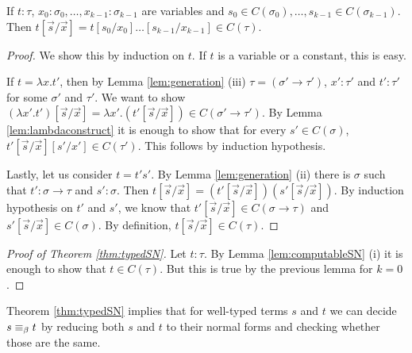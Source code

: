 \begin{boxlem}
    If $t : \tau$, $x_0 : \sigma_0, \dots, x_{k-1} : \sigma_{k-1}$ are variables and $s_0 \in C(\sigma_0), \dots, s_{k-1} \in C(\sigma_{k-1})$. 
    Then $t[\vec{s}/\vec{x}] = t [s_0 / x_0] \dots [s_{k-1} / x_{k - 1}] \in C(\tau)$.
\end{boxlem}
\begin{proof}
    We show this by induction on $t$.
    If $t$ is a variable or a constant, this is easy. 

    If $t = \lambda x. t'$, then by Lemma \ref{lem:generation} (iii) $\tau = (\sigma' \to \tau')$, $x' : \tau'$ and $t' : \tau'$ for some $\sigma'$ and $\tau'$.
    We want to show $(\lambda x'.t')[\vec{s}/\vec{x}] = \lambda x'. (t'[\vec{s}/\vec{x}]) \in C(\sigma' \to \tau')$.
    By Lemma \ref{lem:lambdaconstruct} it is enough to show that for every $s' \in C(\sigma)$, $t'[\vec{s}/\vec{x}][s' / x'] \in C(\tau')$. 
    This follows by induction hypothesis. 

    Lastly, let us consider $t = t's'$.
    By Lemma \ref{lem:generation} (ii) there is $\sigma$ such that $t' : \sigma \to \tau$ and $s' : \sigma$. 
    Then $t[\vec{s}/\vec{x}] = (t'[\vec{s}/\vec{x}])(s' [\vec{s}/\vec{x}])$.
    By induction hypothesis on $t'$ and $s'$, we know that $t'[\vec{s}/\vec{x}] \in C(\sigma \to \tau)$ and $s'[\vec{s} / \vec{x}] \in C(\sigma)$. 
    By definition, $t[\vec{s} / \vec{x}] \in C(\tau)$.
\end{proof}

\begin{proof}[Proof of Theorem \ref{thm:typedSN}]
    Let $t : \tau$.
    By Lemma \ref{lem:computableSN} (i) it is enough to show that $t \in C(\tau)$. 
    But this is true by the previous lemma for $k = 0$.
\end{proof}

\begin{rem}
    Theorem \ref{thm:typedSN} implies that for well-typed terms $s$ and $t$ we can decide $s \equiv_{\beta} t$ by reducing both $s$ and $t$ to their normal forms and checking whether those are the same.
\end{rem}